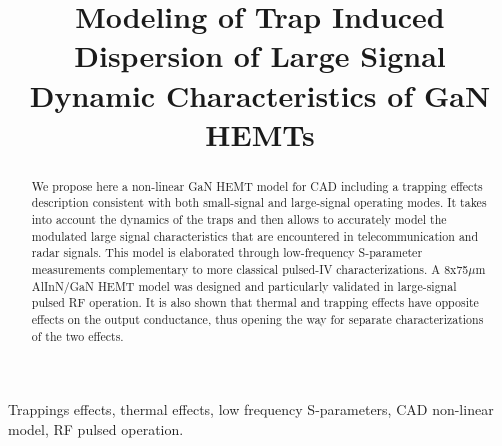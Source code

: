 \documentclass[conference]{IEEEtran}
\begin{document}
\title{\LARGE Modeling of Trap Induced Dispersion of Large Signal Dynamic Characteristics of GaN HEMTs}


\author{
}

\maketitle

\begin{abstract}
    We propose here a non-linear GaN HEMT model for CAD including a trapping effects description consistent with both small-signal and large-signal operating modes. It takes into account the dynamics of the traps and then allows to accurately model the modulated large signal characteristics that are encountered in telecommunication and radar signals. This model is elaborated through low-frequency S-parameter measurements complementary to more classical pulsed-IV characterizations. A 8x75$\mu$m AlInN/GaN HEMT model was designed and particularly validated in large-signal pulsed RF operation. It is also shown that thermal and trapping effects have opposite effects on the output conductance, thus opening the way for separate characterizations of the two effects.
\end{abstract}

\IEEEoverridecommandlockouts
\begin{IEEEkeywords}
    Trappings effects, thermal effects, low frequency S-parameters, CAD non-linear model, RF pulsed operation.
\end{IEEEkeywords}
\end{document}

